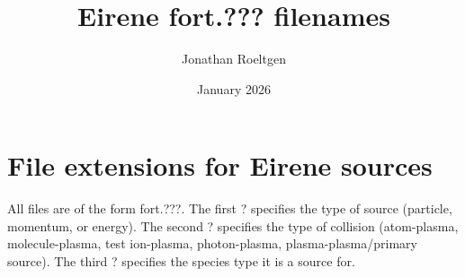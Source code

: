 \documentclass{article}
\title{Eirene fort.??? filenames}
\author{Jonathan Roeltgen}
\date{January 2026}
\begin{document}
\maketitle

\section{File extensions for Eirene sources}
All files are of the form fort.???. The first ? specifies the type of source (particle, momentum, or energy). The second ? specifies the type of collision (atom-plasma, molecule-plasma, test ion-plasma, photon-plasma, plasma-plasma/primary source). The third ? specifies the species type it is a source for.

\end{document}

